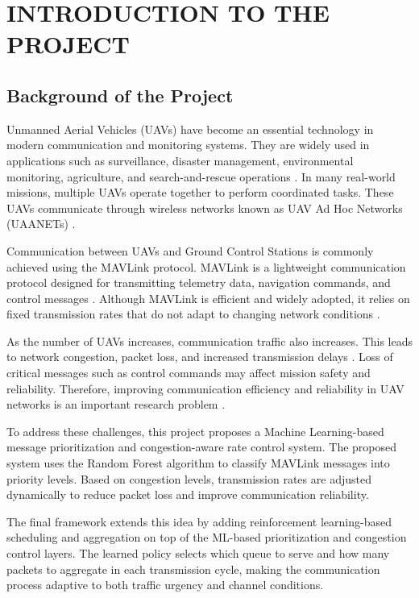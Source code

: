 \chapter{INTRODUCTION TO THE PROJECT}

\section{Background of the Project}

Unmanned Aerial Vehicles (UAVs) have become an essential technology 
in modern communication and monitoring systems. They are widely used 
in applications such as surveillance, disaster management, environmental 
monitoring, agriculture, and search-and-rescue operations 
\cite{ghamari2022unmanned,mohsan2023unmanned}. 
In many real-world missions, multiple UAVs operate together to perform 
coordinated tasks. These UAVs communicate through wireless networks 
known as UAV Ad Hoc Networks (UAANETs) \cite{rovira2022review,nawaz2021uav}.

Communication between UAVs and Ground Control Stations is commonly 
achieved using the MAVLink protocol. MAVLink is a lightweight 
communication protocol designed for transmitting telemetry data, 
navigation commands, and control messages \cite{koubaa2019micro}. 
Although MAVLink is efficient and widely adopted, it relies on fixed 
transmission rates that do not adapt to changing network conditions 
\cite{cordill2025comprehensive}.

As the number of UAVs increases, communication traffic also increases. 
This leads to network congestion, packet loss, and increased 
transmission delays \cite{anwekar2023analysis}. 
Loss of critical messages such as control commands may affect mission 
safety and reliability. Therefore, improving communication efficiency 
and reliability in UAV networks is an important research problem 
\cite{verma2024adaptive}.

To address these challenges, this project proposes a Machine 
Learning-based message prioritization and congestion-aware rate 
control system. The proposed system uses the Random Forest 
algorithm to classify MAVLink messages into priority levels. 
Based on congestion levels, transmission rates are adjusted 
dynamically to reduce packet loss and improve communication 
reliability.

The final framework extends this idea by adding reinforcement 
learning-based scheduling and aggregation on top of the ML-based 
prioritization and congestion control layers. The learned policy 
selects which queue to serve and how many packets to aggregate in 
each transmission cycle, making the communication process adaptive 
to both traffic urgency and channel conditions.

